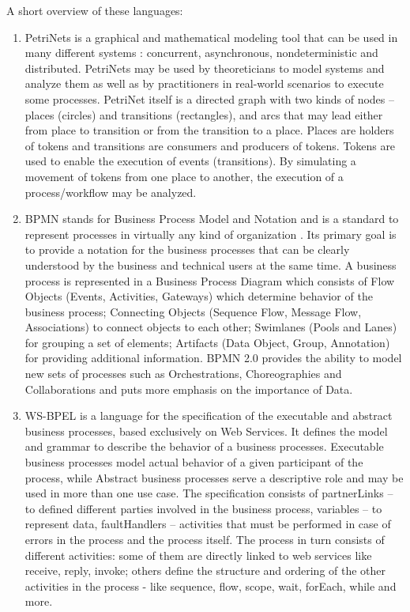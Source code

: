 \noindent 

\noindent A short overview of these languages:

\begin{enumerate}
\item  PetriNets is a graphical and mathematical modeling tool that can be used in many different systems \cite{murata1989petri}: concurrent, asynchronous, nondeterministic and distributed. PetriNets may be used by theoreticians to model systems and analyze them as well as by practitioners in real-world scenarios to execute some processes. PetriNet itself is a directed graph with two kinds of nodes -- places (circles) and transitions (rectangles), and arcs that may lead either from place to transition or from the transition to a place. Places are holders of tokens and transitions are consumers and producers of tokens. Tokens are used to enable the execution of events (transitions). By simulating a movement of tokens from one place to another, the execution of a process/workflow may be analyzed.

\item  BPMN stands for Business Process Model and Notation and is a standard to represent processes in virtually any kind of organization \cite{chinosi2012bpmn}. Its primary goal is to provide a notation for the business processes that can be clearly understood by the business and technical users at the same time. A business process is represented in a Business Process Diagram which consists of Flow Objects (Events, Activities, Gateways) which determine behavior of the business process; Connecting Objects (Sequence Flow, Message Flow, Associations) to connect objects to each other; Swimlanes (Pools and Lanes) for grouping a set of elements; Artifacts (Data Object, Group, Annotation) for providing additional information. BPMN 2.0 provides the ability to model new sets of processes such as Orchestrations, Choreographies and Collaborations and puts more emphasis on the importance of Data.

\item  WS-BPEL is a language for the specification of the executable and abstract business processes, based exclusively on Web Services. It defines the model and grammar to describe the behavior of a business processes. Executable business processes model actual behavior of a given participant of the process, while Abstract business processes serve a descriptive role and may be used in more than one use case. The specification consists of partnerLinks -- to defined different parties involved in the business process, variables -- to represent data, faultHandlers -- activities that must be performed in case of errors in the process and the process itself. The process in turn consists of different activities: some of them are directly linked to web services like receive, reply, invoke; others define the structure and ordering of the other activities in the process - like sequence, flow, scope, wait, forEach, while and more.


\end{enumerate}
